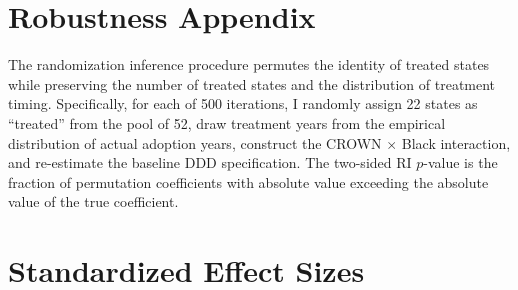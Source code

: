 \documentclass[12pt]{article}
\begin{document}
\section{Robustness Appendix}
\label{app:robust}

The randomization inference procedure permutes the identity of treated states while preserving the number of treated states and the distribution of treatment timing. Specifically, for each of 500 iterations, I randomly assign 22 states as ``treated'' from the pool of 52, draw treatment years from the empirical distribution of actual adoption years, construct the CROWN $\times$ Black interaction, and re-estimate the baseline DDD specification. The two-sided RI $p$-value is the fraction of permutation coefficients with absolute value exceeding the absolute value of the true coefficient.

\section{Standardized Effect Sizes}
\label{sec:sde}


\end{document}
